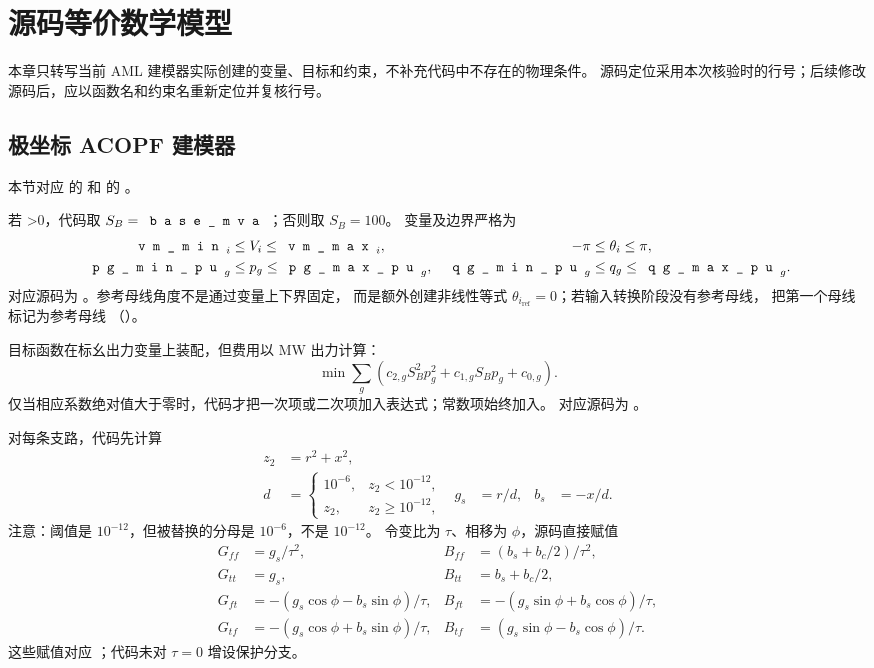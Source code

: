 \section{源码等价数学模型}
\label{sec:power-models-source-equivalent}

本章只转写当前 AML 建模器实际创建的变量、目标和约束，不补充代码中不存在的物理条件。
源码定位采用本次核验时的行号；后续修改源码后，应以函数名和约束名重新定位并复核行号。

\subsection{极坐标 ACOPF 建模器}

本节对应  的
 和
 的
。

若 >0，代码取 $S_B=\fld{base\_mva}$；否则取 $S_B=100$。
变量及边界严格为
\begin{align}
 \fld{vm\_min}_i &\le V_i\le \fld{vm\_max}_i, &
 -\pi&\le\theta_i\le\pi,\\
 \fld{pg\_min\_pu}_g&\le p_g\le\fld{pg\_max\_pu}_g, &
 \fld{qg\_min\_pu}_g&\le q_g\le\fld{qg\_max\_pu}_g .
\end{align}
对应源码为 。参考母线角度不是通过变量上下界固定，
而是额外创建非线性等式 $\theta_{i_{\mathrm{ref}}}=0$；若输入转换阶段没有参考母线，
 把第一个母线标记为参考母线
（）。

目标函数在标幺出力变量上装配，但费用以 MW 出力计算：
\begin{equation}
 \min \sum_g\left(c_{2,g}S_B^2p_g^2+c_{1,g}S_Bp_g+c_{0,g}\right).
 \label{eq:aml-acopf-objective}
\end{equation}
仅当相应系数绝对值大于零时，代码才把一次项或二次项加入表达式；常数项始终加入。
对应源码为 。

对每条支路，代码先计算
\begin{align}
 z_2&=r^2+x^2,\\
 d&=\begin{cases}10^{-6},&z_2<10^{-12},\\z_2,&z_2\ge 10^{-12},\end{cases}&
 g_s&=r/d,&b_s&=-x/d .
\end{align}
注意：阈值是 $10^{-12}$，但被替换的分母是 $10^{-6}$，不是 $10^{-12}$。
令变比为 $\tau$、相移为 $\phi$，源码直接赋值
\begin{align}
 G_{ff}&=g_s/\tau^2,&B_{ff}&=(b_s+b_c/2)/\tau^2,\\
 G_{tt}&=g_s,&B_{tt}&=b_s+b_c/2,\\
 G_{ft}&=-(g_s\cos\phi-b_s\sin\phi)/\tau,&
 B_{ft}&=-(g_s\sin\phi+b_s\cos\phi)/\tau,\\
 G_{tf}&=-(g_s\cos\phi+b_s\sin\phi)/\tau,&
 B_{tf}&=(g_s\sin\phi-b_s\cos\phi)/\tau.
\end{align}
这些赋值对应 ；代码未对 $\tau=0$ 增设保护分支。

